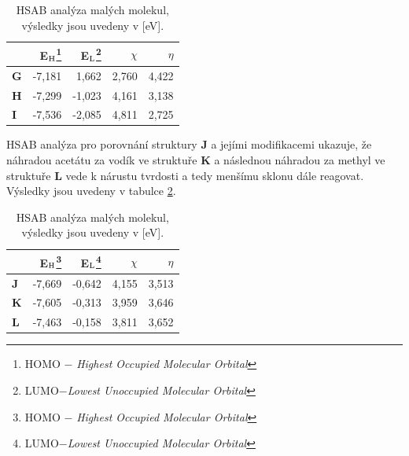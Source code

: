 \documentclass[
digital, %
table,   %
lof,     %
lot,     %
oneside,
]{fithesis3}
\begin{document}
\begin{table}[htbp]\begin{minipage}{\textwidth}
\begin{center}\caption{HSAB analýza malých molekul, výsledky jsou uvedeny v [eV].}\begin{tabular}{|l|r|r|r|r|}
\hline
\label{hsab_smallI}& E$_{\ce{H}}$\footnote{HOMO $-$ \textit{Highest Occupied Molecular Orbital}}  & E$_{\ce{L}}$\footnote{LUMO$ - $\textit{Lowest Unoccupied Molecular Orbital}} & $\chi$  & $\eta$  \\ \hline
\textbf{G} & -7,181 & 1,662 & 2,760 & 4,422 \\ \hline
\textbf{H} & -7,299 & -1,023 & 4,161 & 3,138 \\ \hline
\textbf{I} & -7,536 & -2,085 & 4,811 & 2,725 \\ \hline
\end{tabular}
\end{center}\end{minipage}
\end{table}

HSAB analýza pro porovnání struktury  \textbf{J} a jejími modifikacemi ukazuje, že náhradou acetátu za vodík ve struktuře \textbf{K} a následnou náhradou za methyl ve struktuře \textbf{L} vede k nárustu tvrdosti a tedy menšímu sklonu dále reagovat.  Výsledky jsou uvedeny v tabulce \ref{hsab_small_porovnani}.

\begin{table}[htbp]\begin{minipage}{\textwidth}
\begin{center}\caption{HSAB analýza malých molekul, výsledky jsou uvedeny v [eV].}
\begin{tabular}{|l|r|r|r|r|}
\hline
\label{hsab_small_porovnani}& E$_{\ce{H}}$\footnote{HOMO $-$ \textit{Highest Occupied Molecular Orbital}}  & E$_{\ce{L}}$\footnote{LUMO$ - $\textit{Lowest Unoccupied Molecular Orbital}} & $\chi$  & $\eta$  \\ \hline
\textbf{J} & -7,669 & -0,642 & 4,155 & 3,513 \\ \hline
\textbf{K} & -7,605 & -0,313 & 3,959 & 3,646 \\ \hline
\textbf{L} & -7,463 & -0,158 & 3,811 & 3,652 \\ \hline
\end{tabular}
\end{center}\end{minipage}
\end{table}
\end{document}
